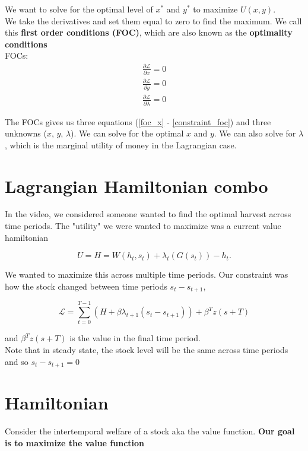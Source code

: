 \documentclass{article}
\begin{document}
We want to solve for the optimal level of $x^*$ and $y^*$ to maximize $U(x,y)$. \\

We take the derivatives and set them equal to zero to find the maximum. We call this \textbf{first order conditions (FOC)}, which are also known as the \textbf{optimality conditions}\\

FOCs:
\begin{align}
    \frac{\partial \mathscr{L}}{\partial x} =0 \label{foc_x}\\
    \frac{\partial \mathscr{L}}{\partial y} =0 \label{foc_y}\\
    \frac{\partial \mathscr{L}}{\partial \lambda} =0 \label{constraint_foc}
\end{align}

The FOCs gives us three equations (\ref{foc_x} - \ref{constraint_foc}) and three unknowns ($x$, $y$, $\lambda$). We can solve for the optimal $x$ and $y$. We can also solve for $\lambda$, which is the marginal utility of money in the Lagrangian case.


\section{Lagrangian Hamiltonian combo}
In the video, we considered someone wanted to find the optimal harvest across time periods. The "utility" we were wanted to maximize was a current value hamiltonian  

$$U = H  = W(h_t, s_t) + \lambda_t (G(s_t)) - h_t. $$ 

We wanted to maximize this across multiple time periods. Our constraint was how the stock changed between time periods $s_t - s_{t+1}$,

$$\mathscr{L} = \sum_{t=0}^{T-1}(H + \beta \lambda_{t+1}(s_t - s_{t+1})) + \beta^T z(s+T)$$

and $\beta^T z(s+T)$ is the value in the final time period. \\

Note that in steady state, the stock level will be the same across time periods and so $s_t - s_{t+1} = 0$

\section{Hamiltonian}
Consider the intertemporal welfare of a stock aka the value function. \textbf{Our goal is to maximize the value function }
\end{document}
